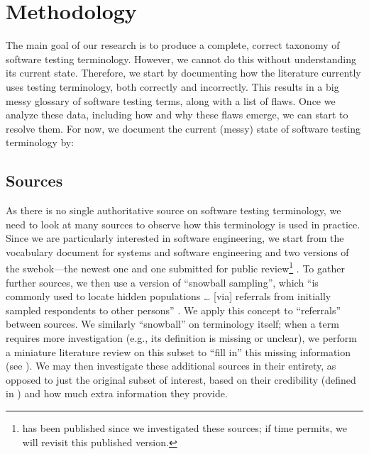 \section{Methodology}\label{methodology}

The main goal of our research is to produce a complete, correct taxonomy of
software testing terminology. However, we cannot do this without understanding
its current state. Therefore, we start by documenting how the literature
currently uses testing terminology, both correctly and incorrectly. This
results in a big messy glossary of software testing terms, along with a list of
flaws. Once we analyze these data, including how and why these flaws emerge, we
can start to resolve them. For now, we document the current (messy) state of
software testing terminology by:



\subsection{Sources}\label{sources}
As there is no single authoritative source on software testing terminology,
we need to look at many sources to observe how this terminology is used in
practice. Since we are particularly interested in software engineering, we
start from the vocabulary document for systems and software engineering%
\citep{IEEE2017} and two versions of the \acf{swebok}---the newest
one \citep{SWEBOK2014} and one submitted for public review\footnote{
     \citep{SWEBOK2024} has been published since we investigated
    these sources; if time permits, we will revisit this published version.
} \citep{SWEBOK2024}. To gather further sources, we then use a version of
``snowball sampling'',
which ``is commonly used to locate hidden populations \dots{} [via] referrals
from initially sampled respondents to other persons'' \citep{Johnson2014}. We
apply this concept to ``referrals'' between sources. \addTextEx{} We similarly
``snowball'' on terminology itself; when a term requires more investigation
(e.g., its definition is missing or unclear), we perform a
miniature literature review on this subset to ``fill in'' this missing
information (see ). We may then investigate these additional
sources in their entirety, as opposed to just the original subset of interest,
based on their credibility (defined in ) and how much extra
information they provide.

